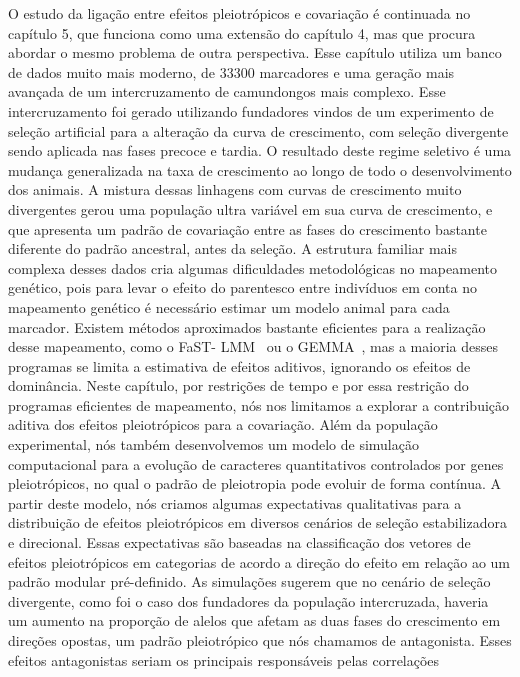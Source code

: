 \begin{refsection}
O estudo da ligação entre efeitos pleiotrópicos e covariação é continuada no
capítulo 5, que funciona como uma extensão do capítulo 4, mas que procura
abordar o mesmo problema de outra perspectiva. Esse capítulo utiliza um banco
de dados muito mais moderno, de 33300 marcadores e uma geração mais avançada
de um intercruzamento de camundongos mais complexo. Esse intercruzamento foi
gerado utilizando fundadores vindos de um experimento de seleção artificial
para a alteração da curva de crescimento, com seleção divergente sendo
aplicada nas fases precoce e tardia. O resultado deste regime seletivo é uma
mudança generalizada na taxa de crescimento ao longo de todo o desenvolvimento
dos animais. A mistura dessas linhagens com curvas de crescimento muito
divergentes gerou uma população ultra variável em sua curva de crescimento, e
que apresenta um padrão de covariação entre as fases do crescimento bastante
diferente do padrão ancestral, antes da seleção. A estrutura familiar mais
complexa desses dados cria algumas dificuldades metodológicas no mapeamento
genético, pois para levar o efeito do parentesco entre indivíduos em conta no
mapeamento genético é necessário estimar um modelo animal para cada marcador.
Existem métodos aproximados bastante eficientes para a realização desse
mapeamento, como o FaST- LMM~\parencite{Lippert2011-jn} ou o
GEMMA~\parencite{Zhou2012-zl}, mas a maioria desses programas se limita a
estimativa de efeitos aditivos, ignorando os efeitos de dominância. Neste
capítulo, por restrições de tempo e por essa restrição do programas eficientes
de mapeamento, nós nos limitamos a explorar a contribuição aditiva dos efeitos
pleiotrópicos para a covariação. Além da população experimental, nós também
desenvolvemos um modelo de simulação computacional para a evolução de
caracteres quantitativos controlados por genes pleiotrópicos, no qual o padrão
de pleiotropia pode evoluir de forma contínua. A partir deste modelo, nós
criamos algumas expectativas qualitativas para a distribuição de efeitos
pleiotrópicos em diversos cenários de seleção estabilizadora e direcional.
Essas expectativas são baseadas na classificação dos vetores de efeitos
pleiotrópicos em categorias de acordo a direção do efeito em relação ao um
padrão modular pré-definido. As simulações sugerem que no cenário de seleção
divergente, como foi o caso dos fundadores da população intercruzada, haveria
um aumento na proporção de alelos que afetam as duas fases do crescimento em
direções opostas, um padrão pleiotrópico que nós chamamos de antagonista.
Esses efeitos antagonistas seriam os principais responsáveis pelas correlações

\end{refsection}
